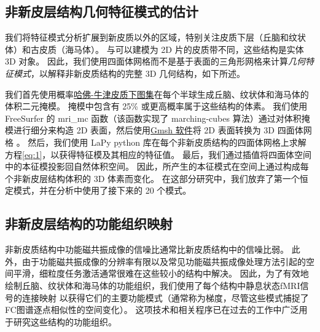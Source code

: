 \documentclass[lang=cn,a4paper,newtx]{elegantpaper}
\begin{document}
\subsection{非新皮层结构几何特征模式的估计} \label{sec:geometric_estimation}

我们将特征模式分析扩展到新皮质以外的区域，特别关注皮质下层（丘脑和纹状体）和古皮质（海马体）。
与可以建模为 2D 片的皮质带不同，这些结构是实体 3D 对象。 
因此，我们使用四面体网格而不是基于表面的三角形网格来计算\textit{几何特征模式}，以解释非新皮质结构的完整 3D 几何结构\cite{wachinger2015brainprint}，如下所述。


我们首先使用概率\href{https://fsl.fmrib.ox.ac.uk/fsl/fslwiki/Atlases}{哈佛-牛津皮质下图集}在每个半球生成丘脑、纹状体和海马体的体积二元掩模。
掩模中包含有 25\% 或更高概率属于这些结构的体素。
我们使用 FreeSurfer 的 mri\_mc 函数（该函数实现了 marching-cubes 算法）通过对体积掩模进行细分来构造 2D 表面，然后使用\href{https://gmsh.info/}{Gmsh 软件}将 2D 表面转换为 3D 四面体网格 。
然后，我们使用 LaPy python 库在每个非新皮质结构的四面体网格上求解方程\ref{eq:1}，以获得特征模及其相应的特征值。
最后，我们通过插值将四面体空间中的本征模投影回自然体积空间。
因此，所产生的本征模式在空间上通过构成每个非新皮层结构体积的 3D 体素而变化。
在这部分研究中，我们放弃了第一个恒定模式，并在分析中使用了接下来的 20 个模式。


\subsection{非新皮层结构的功能组织映射} \label{sec:functional_mapping}

非新皮质结构中功能磁共振成像的信噪比通常比新皮质结构中的信噪比弱\cite{uugurbil2013pushing}。
此外，由于功能磁共振成像的分辨率有限以及常见功能磁共振成像处理方法引起的空间平滑，细粒度任务激活通常很难在这些较小的结构中解决。
因此，为了有效地绘制丘脑、纹状体和海马体的功能组织，我们使用了每个结构中静息状态fMRI信号的连接映射\cite{haak2018connectopic} 以获得它们的主要功能模式（通常称为梯度，尽管这些模式捕捉了FC图谱逐点相似性的空间变化）。
这项技术和相关程序已在过去的工作中广泛用于研究这些结构的功能组织\cite{vos2018anatomical,yang2020thalamic,oldehinkel2022mapping}。
\end{document}
